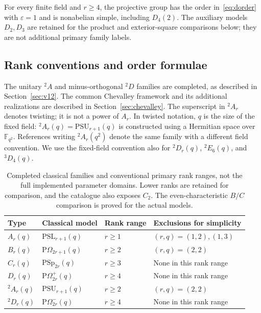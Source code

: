 \documentclass[11pt]{article}
\numberwithin{equation}{section}
\theoremstyle{definition}
\newcommand{\F}{\mathbb F}
\newcommand{\PSL}{\mathrm{PSL}}
\newcommand{\PSU}{\mathrm{PSU}}
\newcommand{\PSp}{\mathrm{PSp}}
\newcommand{\POm}{\mathrm{P}\Omega}
\begin{document}
For every finite field and $r\geq4$, the projective group has the
order in~\eqref{eq:dorder} with $\varepsilon=1$ and is nonabelian
simple, including $D_4(2)$. The auxiliary models $D_2,D_3$ are
retained for the product and exterior-square comparisons below;
they are not additional primary family labels.

\subsection{Rank conventions and order formulae}

The unitary $ {}^2A$ and minus-orthogonal $ {}^2D$ families are completed,
as described in Section~\ref{sec:v12}. The common Chevalley framework
and its additional realizations are described in Section~\ref{sec:chevalley}.
The superscript in $ {}^2A_r$ denotes twisting; it is not a power of
$A_r$. In twisted notation, $q$ is the size of the fixed field:
$ {}^2A_r(q)=\PSU_{r+1}(q)$ is constructed using a Hermitian space over
$\F_{q^2}$. References writing $ {}^2A_r(q^2)$ denote the same family
with a different field convention. We use the fixed-field convention
also for $ {}^2D_r(q)$, $ {}^2E_6(q)$, and $ {}^3D_4(q)$.

\begin{table}[!htbp]
\centering\small
\renewcommand{\arraystretch}{1.12}
\begin{tabularx}{\textwidth}{@{}l l l X@{}}
\toprule
Type & Classical model & Rank range & Exclusions for simplicity\\
\midrule
$A_r(q)$ & $\PSL_{r+1}(q)$ & $r\geq1$ & $(r,q)=(1,2),(1,3)$\\
$B_r(q)$ & $\POm_{2r+1}(q)$ & $r\geq2$ & $(r,q)=(2,2)$\\
$C_r(q)$ & $\PSp_{2r}(q)$ & $r\geq3$ & None in this rank range\\
$D_r(q)$ & $\POm^+_{2r}(q)$ & $r\geq4$ & None in this rank range\\
$ {}^2A_r(q)$ & $\PSU_{r+1}(q)$ & $r\geq2$ & $(r,q)=(2,2)$\\
$ {}^2D_r(q)$ & $\POm^-_{2r}(q)$ & $r\geq4$ & None in this rank range\\
\bottomrule
\end{tabularx}
\caption{Completed classical families and conventional primary rank ranges,
not the full implemented parameter domains. Lower ranks are retained for
comparison, and the catalogue also exposes $C_2$. The even-characteristic
$B/C$ comparison is proved for the actual models.}
\label{tab:classical}
\end{table}
\end{document}
